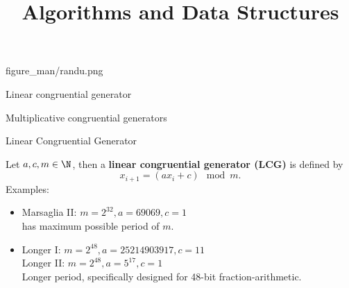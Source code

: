 \documentclass[11pt,compress,t,notes=noshow, xcolor=table]{beamer}
\title{Algorithms and Data Structures}
\begin{document}
{figure_man/randu.png}
{
  \item Linear congruential generator
  \item Multiplicative congruential generators
}

\begin{vbframe}{Linear Congruential Generator}

Let $a,c,m \in \N$, then a \textbf{linear congruential generator (LCG)} is defined by
$$
  x_{i+1} = (a x_i + c) \mod m.
$$
Examples:
\begin{itemize}
 \item Marsaglia II: $m = 2^{32}, a = 69069, c = 1$ \\
has maximum possible period of $m$.
\item Longer I: $m = 2^{48}, a = 25214903917, c = 11$ \\
Longer II: $m = 2^{48}, a = 5^{17}, c = 1$ \\
Longer period, specifically designed for 48-bit fraction-arithmetic.
\end{itemize}

%

\end{vbframe}
\end{document}
